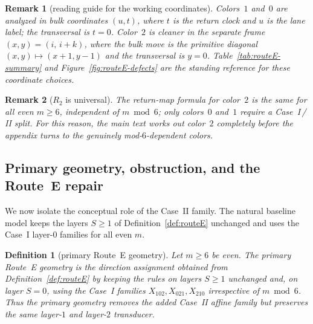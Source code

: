 \documentclass[11pt]{article}
\newtheorem{definition}{Definition}
\newtheorem{remark}{Remark}
\begin{document}
\begin{remark}[reading guide for the working coordinates]\label{rem:coord-guide}
Colors~$1$ and~$0$ are analyzed in bulk coordinates $(u,t)$, where $t$ is the return clock and $u$ is the lane label; the transversal is $t=0$.
Color~$2$ is cleaner in the separate frame $(x,y)=(i,\,i+k)$, where the bulk move is the primitive diagonal $(x,y)\mapsto(x+1,y-1)$ and the transversal is $y=0$.
Table~\ref{tab:routeE-summary} and Figure~\ref{fig:routeE-defects} are the standing reference for these coordinate choices.
\end{remark}

\begin{remark}[$R_2$ is universal]\label{rem:R2-universal}
The return-map formula for color~$2$ is the same for all even $m\ge 6$, independent of $m\bmod 6$; only colors~$0$ and~$1$ require a Case~I\,/\,II split.
For this reason, the main text works out color~$2$ completely before the appendix turns to the genuinely mod-$6$-dependent colors.
\end{remark}

\subsection{Primary geometry, obstruction, and the Route~E repair}\label{sec:primary-obstruction}

We now isolate the conceptual role of the Case~II family.
The natural baseline model keeps the layers $S\ge 1$ of Definition~\ref{def:routeE} unchanged and uses the Case~I layer-$0$ families for all even $m$.

\begin{definition}[primary Route~E geometry]\label{def:routeE-primary}
Let $m\ge 6$ be even.
The \emph{primary Route~E geometry} is the direction assignment obtained from Definition~\ref{def:routeE} by keeping the rules on layers $S\ge 1$ unchanged and, on layer $S=0$, using the Case~I families $X_{102},X_{021},X_{210}$ irrespective of $m\bmod 6$.
Thus the primary geometry removes the added Case~II affine family but preserves the same layer-$1$ and layer-$2$ transducer.
\end{definition}
\end{document}
